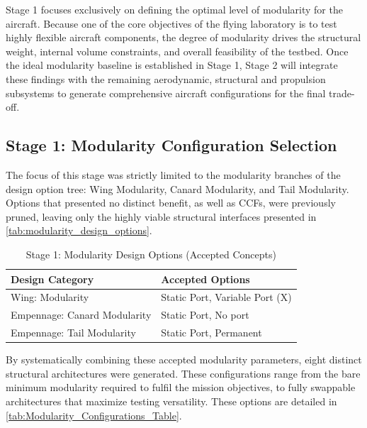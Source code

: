 Stage 1 focuses exclusively on defining the optimal level of modularity for the aircraft. Because one of the core objectives of the flying laboratory is to test highly flexible aircraft components, the degree of modularity drives the structural weight, internal volume constraints, and overall feasibility of the testbed. Once the ideal modularity baseline is established in Stage 1, Stage 2 will integrate these findings with the remaining aerodynamic, structural and propulsion subsystems to generate comprehensive aircraft configurations for the final trade-off.

\subsection{Stage 1: Modularity Configuration Selection}
 The focus of this stage was strictly limited to the modularity branches of the design option tree: Wing Modularity, Canard Modularity, and Tail Modularity. Options that presented no distinct benefit, as well as CCFs, were previously pruned, leaving only the highly viable structural interfaces presented in \autoref{tab:modularity_design_options}.

\begin{table}[H]
    \centering
    \caption{Stage 1: Modularity Design Options (Accepted Concepts)}
    \label{tab:modularity_design_options}
    \renewcommand{\arraystretch}{1.2}
    \begin{tabular}{|l|p{10cm}|}
        \hline
        \textbf{Design Category} & \textbf{Accepted Options} \\ \hline \hline
        Wing: Modularity & Static Port, Variable Port (X) \\ \hline
        Empennage: Canard Modularity & Static Port, No port \\ \hline
        Empennage: Tail Modularity & Static Port, Permanent \\ \hline
    \end{tabular}
\end{table}

By systematically combining these accepted modularity parameters, eight distinct structural architectures were generated. These configurations range from the bare minimum modularity required to fulfil the mission objectives, to fully swappable architectures that maximize testing versatility. These options are detailed in \autoref{tab:Modularity_Configurations_Table}.

